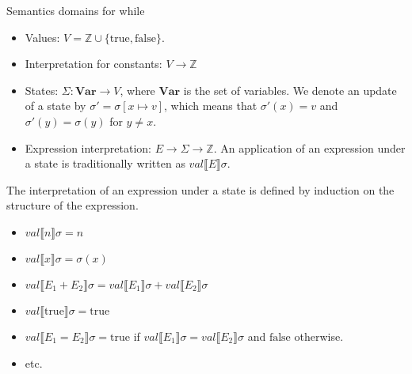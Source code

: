 \documentclass{beamer}
\begin{document}
    \begin{frame}{Semantics domains for while}
      \begin{itemize}
        \item Values: $V=\mathbb{Z}\cup\{\text{true},\text{false}\}$.
        \item Interpretation for constants: $V\to\mathbb{Z}$
        \item States: $\Sigma:\textbf{Var}\to V$, where $\textbf{Var}$ is the set of variables. We denote an update of a state by $\sigma'=\sigma[x\mapsto v]$, which means that $\sigma'(x)=v$ and $\sigma'(y)=\sigma(y)$ for $y\neq x$.
        \item Expression interpretation: $E\to\Sigma\to\mathbb{Z}$. An application of an expression under a state is traditionally written as $val\llbracket E\rrbracket\sigma$.
      \end{itemize}
      The interpretation of an expression under a state is defined by induction on the structure of the expression.
      \begin{itemize}
        \item $val\llbracket n\rrbracket\sigma=n$
        \item $val\llbracket x\rrbracket\sigma=\sigma(x)$
        \item $val\llbracket E_1+E_2\rrbracket\sigma=val\llbracket E_1\rrbracket\sigma+val\llbracket E_2\rrbracket\sigma$
        \item $val\llbracket\text{true}\rrbracket\sigma=\text{true}$
        \item $val\llbracket E_1=E_2\rrbracket\sigma=\text{true}$ if $val\llbracket E_1\rrbracket\sigma=val\llbracket E_2\rrbracket\sigma$ and $\text{false}$ otherwise.
        \item etc.
      \end{itemize}
    \end{frame}
\end{document}
